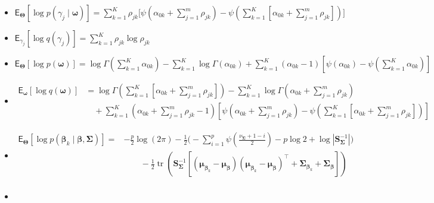 \begin{itemize}
\begin{itemize}
    \item 
    $
    \mathsf{E}_{\bm{\Theta}}\left[\log p(\gamma_j\mid\bm{\omega})\right]=\sum_{k=1}^{K}\rho_{jk}
\Bigg[
\psi\left(\alpha_{0k}+\sum_{j=1}^{m}\rho_{jk}\right) -\psi\left(\sum_{k=1}^{K}\left[\alpha_{0k}+\sum_{j=1}^{m}\rho_{jk} \right]\right)
\Bigg]
    $

    \item 
    $
      \mathsf{E}_{\gamma_j}\left[\log q(\gamma_j)\right]=\sum_{k=1}^{K}\rho_{jk}\log\rho_{jk}  
    $

    \item 
    $
        \mathsf{E}_{\bm{\Theta}}\left[\log p(\bm{\omega})\right]=\log\Gamma\left( \sum_{k=1}^{K} \alpha_{0k} \right)-\sum_{k=1}^{K} \log\Gamma\left(\alpha_{0k}\right)+\sum_{k=1}^{K}\left(\alpha_{0k}-1\right)\left[\psi\left(\alpha_{0k}\right) -\psi\left(\sum_{k=1}^{K}\alpha_{0k}\right)\right] 
    $

        \item 
    $
    \begin{aligned}
    \mathsf{E}_{\bm{\omega}}\left[\log q(\bm{\omega})\right]
    &=\log\Gamma\left( \sum_{k=1}^{K} \left[\alpha_{0k}+\sum_{j=1}^{m}\rho_{jk} \right]\right)-\sum_{k=1}^{K} \log\Gamma\left(\alpha_{0k}+\sum_{j=1}^{m}\rho_{jk}\right)\\
        &\quad+\sum_{k=1}^{K}\left(\alpha_{0k}+\sum_{j=1}^{m}\rho_{jk} -1\right)\left[\psi\left(\alpha_{0k}+\sum_{j=1}^{m}\rho_{jk}\right) -\psi\left(\sum_{k=1}^{K}\left[\alpha_{0k}+\sum_{j=1}^{m}\rho_{jk} \right]\right)\right]
    \end{aligned}
    $

        \item

    $
        \begin{aligned}
        \mathsf{E}_{\bm{\Theta}}\left[\log p(\bm{\beta}_k\mid\bm{\beta},\bm{\Sigma})\right]=&
    -\tfrac{p}{2}\log(2\pi)
    -\tfrac{1}{2}\Bigg(
    -\sum_{i=1}^{p}\psi\!\!\left(\tfrac{\nu_{\bm{\Sigma}}+1-i}{2}\right)-p\log 2+\log|\bm{S}_{\bm{\Sigma}}^{-1}|
    \Bigg) \\
    &\qquad
    -\tfrac{1}{2}\operatorname{tr}\left(\bm{S}_{\bm{\Sigma}}^{-1}\!\!\left[
    (\bm{\mu}_{\bm{\beta}_k}-\bm{\mu}_{\bm{\beta}})
    (\bm{\mu}_{\bm{\beta}_k}-\bm{\mu}_{\bm{\beta}})^\top
    +\bm{\Sigma}_{\bm{\beta}_k}+\bm{\Sigma}_{\bm{\beta}}
    \right]\right)\\
        \end{aligned}
    $

        \item


\end{itemize}
\end{itemize}

